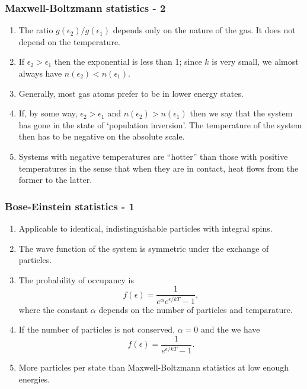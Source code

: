 \documentclass{beamer}
\begin{document}
\begin{frame}
\frametitle{Maxwell-Boltzmann statistics - 2}
\begin{enumerate}
\item The ratio $g(\epsilon_2)/g(\epsilon_1)$ depends only on the nature of the
gas. It does not depend on the temperature.
\item If $\epsilon_2 > \epsilon_1$ then the exponential is less than 1; since 
$k$ is very small, we almost always have $n(\epsilon_2) < n(\epsilon_1)$.
\item Generally, most gas atoms prefer to be in lower energy states.
\item If, by some way, $\epsilon_2>\epsilon_1$ and $n(\epsilon_2)>n(\epsilon_1)$
then we say that the system has gone in the state of `population inversion'. The
temperature of the system then has to be negative on the absolute scale.
\item Systems with negative temperatures are ``hotter'' than those with positive
temperatures in the sense that when they are in contact, heat flows from the
former to the latter.
\end{enumerate}
\end{frame}

\begin{frame}
\frametitle{Bose-Einstein statistics - 1}
\begin{enumerate}
\item Applicable to identical, indistinguishable particles with integral spins.
\item The wave function of the system is symmetric under the exchange of 
particles.
\item The probability of occupancy is
\begin{equation}\label{e6}
f(\epsilon) = \frac{1}{e^\alpha e^{\epsilon/kT} - 1},
\end{equation}
where the constant $\alpha$ depends on the number of particles and temparature.
\item If the number of particles is not conserved, $\alpha = 0$ and the we have
\begin{equation}\label{e7}
f(\epsilon) = \frac{1}{e^{\epsilon/kT} - 1}.
\end{equation}
\item More particles per state than Maxwell-Boltzmann statistics at low enough
energies.
\end{enumerate}
\end{frame}
\end{document}
